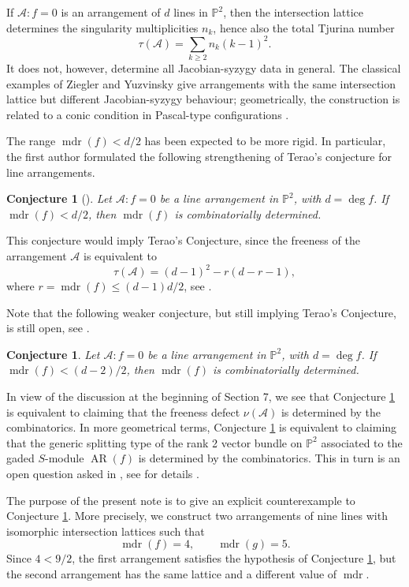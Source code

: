 \documentclass[11pt]{amsart}
\newcommand{\PP}{\mathbb P}
\newcommand{\cA}{\mathcal A}
\newcommand{\AR}{\operatorname{AR}}
\newcommand{\mdr}{\operatorname{mdr}}
\theoremstyle{plain}
\newtheorem{conjecture}[theorem]{Conjecture}
\theoremstyle{definition}
\numberwithin{equation}{section}
\begin{document}
If \(\cA:f=0\) is an arrangement of \(d\) lines in \(\PP^2\), then the intersection lattice determines the singularity multiplicities \(n_k\), hence also the total Tjurina number
\[
\tau(\cA)=\sum_{k\geq 2}n_k(k-1)^2.
\]
It does not, however, determine all Jacobian-syzygy data in general.  The classical examples of Ziegler \cite{Ziegler} and Yuzvinsky \cite{Yuzvinsky} give arrangements with the same intersection lattice but different Jacobian-syzygy behaviour; geometrically, the construction is related to a conic condition in Pascal-type configurations \cite{DimcaSticlaruPascal}.

The range \(\mdr(f)<d/2\) has been expected to be more rigid.  In particular, the first author formulated the following strengthening of Terao's conjecture for line arrangements.

\begin{conjecture}[{\cite[Conjecture~3.5]{DimcaOpen}}]
\label{mainc}
\emph{Let \(\cA:f=0\) be a line arrangement in \(\PP^2\), with \(d=\deg f\).  If \(\mdr(f)<d/2\), then \(\mdr(f)\) is combinatorially determined.}
\end{conjecture}

This conjecture would imply Terao's Conjecture, since the freeness of the arrangement $\cA$ is equivalent to 
$$\tau(\cA)=(d-1)^2-r(d-r-1),$$
where $r=\mdr(f)\leq (d-1)d/2$, see
\cite{duPCTC, Dmax}.

Note that the following weaker conjecture, but still implying Terao's Conjecture, is still open, see \cite[Conjecture~3.7]{DimcaOpen}.

\begin{conjecture}
\label{C2}
\emph{Let \(\cA:f=0\) be a line arrangement in \(\PP^2\), with \(d=\deg f\).  If \(\mdr(f)< (d-2)/2\), then \(\mdr(f)\) is combinatorially determined.}
\end{conjecture}
In view of the discussion at the beginning of Section 7, we see that Conjecture \ref{C2} is equivalent to claiming that the freeness defect $\nu(\cA)$ is determined by the combinatorics. In more geometrical terms,
Conjecture \ref{C2} is equivalent to claiming that the generic splitting type of the rank 2 vector bundle on $\PP^2$ associated to the gaded $S$-module $\AR(f)$ is determined by the combinatorics. This in turn is an open question asked in \cite[Question 7.12]{Cook+}, see for details \cite[Conjecture 3.9]{DimcaOpen}.

The purpose of the present note is to give an explicit counterexample to Conjecture \ref{mainc}. More precisely, we construct two arrangements of nine lines with isomorphic intersection lattices such that
\[
\mdr(f)=4,
\qquad
\mdr(g)=5.
\]
Since \(4<9/2\), the first arrangement satisfies the hypothesis of Conjecture \ref{mainc}, but the second arrangement has the same lattice and a different value of \(\mdr\).
\end{document}
